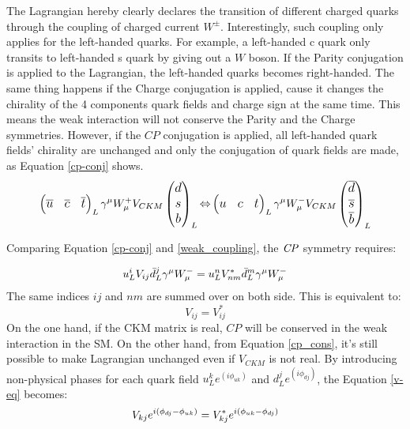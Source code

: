
The Lagrangian hereby clearly declares the transition of different charged quarks through the coupling of charged current $W^{\pm}$. Interestingly, such coupling only applies for the left-handed quarks. For example, a left-handed c quark only transits to left-handed s quark by giving out a $W$ boson. If the Parity conjugation is applied to the Lagrangian, the left-handed quarks becomes right-handed. The same thing happens if the Charge conjugation is applied, cause it changes the chirality of the 4 components quark fields and charge sign at the same time. This means the weak interaction will not conserve the Parity and the Charge symmetries. However, if the $CP$ conjugation is applied, all left-handed quark fields' chirality are  unchanged and only the conjugation of quark fields are made, as Equation \ref{cp-conj} shows.
\begin{equation}\label{cp-conj}
\small
\large
\begin{pmatrix}
\overline{u}&\overline{c}&\overline{t}
\end{pmatrix}_L
\gamma^\mu W^{+}_{\mu}
V_{CKM}
\begin{pmatrix}
d\\s\\b\\
\end{pmatrix}_L
{\Leftrightarrow}
\begin{pmatrix}
{u}&{c}&{t}
\end{pmatrix}_L
\gamma^\mu W^{-}_{\mu}
{V_{CKM}}
\begin{pmatrix}
\overline d\\\overline s\\\overline b\\
\end{pmatrix}_L
\end{equation} 

Comparing  Equation \ref{cp-conj} and \ref{weak_coupling}, the $\it{CP}$ symmetry requires: 

\begin{equation}\label{cp_cons}
\large
{u_{L}^i}V_{ij} \bar{d}^{j}_L \gamma^\mu W^{-}_{\mu}
=
{{u}^{n}_LV^{*}_{nm}\bar{d}_{L}^m}  \gamma^\mu W^{-}_{\mu}
\end{equation}
The same indices $ij$ and $nm$ are summed over on both side. This is equivalent to: 
\begin{equation}\label{v-eq}
V_{ij} = V^{*}_{ij}
\end{equation}
On the one hand, if the CKM matrix is real, $CP$ will be conserved in the weak interaction in the SM. On the other hand, from Equation \ref{cp_cons}, it's still possible to make Lagrangian unchanged even if $V_{CKM}$ is not real. By introducing non-physical phases for each quark field $u^k_L e^{(i\phi_{uk})}$ and $d^j_L e^{(i\phi_{dj})}$, the Equation \ref{v-eq} becomes:
\begin{equation}
\Large
V_{kj} e^{i(\phi_{dj}-\phi_{uk})} = V^{*}_{kj}e^{i(\phi_{uk}-\phi_{dj})}
\end{equation}

